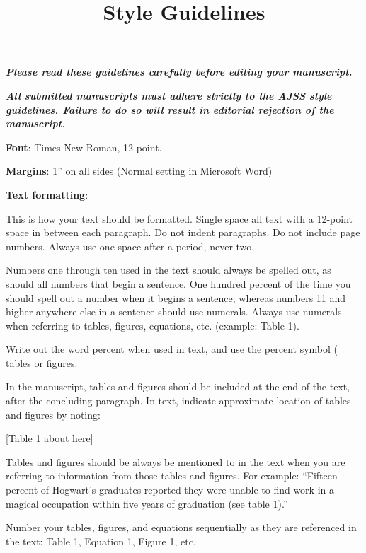 \documentclass{ajss}
\begin{document}
\title{\textbf{\fontsize{16pt}{16pt}\selectfont Style Guidelines}}
\date{}
\maketitle

\begin{center}
  \textbf{\textit{Please read these guidelines carefully before editing your manuscript.}}

  \textbf{\textit{All submitted manuscripts must adhere strictly to the AJSS style guidelines. Failure to do so
will result in editorial rejection of the manuscript.}}
\end{center}
\vspace{2\baselineskip}

\textbf{Font}: Times New Roman, 12-point.

\textbf{Margins}: 1'' on all sides (Normal setting in Microsoft Word)

\textbf{Text formatting}:

This is how your text should be formatted. Single space all text with a 12-point space in between
each paragraph. Do not indent paragraphs. Do not include page numbers. Always use one space
after a period, never two.

Numbers one through ten used in the text should always be spelled out, as should all numbers
that begin a sentence. One hundred percent of the time you should spell out a number when it
begins a sentence, whereas numbers 11 and higher anywhere else in a sentence should use
numerals. Always use numerals when referring to tables, figures, equations, etc. (example: Table
1).

Write out the word percent when used in text, and use the percent symbol (%
tables or figures.

In the manuscript, tables and figures should be included at the end of the text, after the
concluding paragraph. In text, indicate approximate location of tables and figures by noting:

[Table 1 about here]

Tables and figures should be always be mentioned to in the text when you are referring to
information from those tables and figures. For example: “Fifteen percent of Hogwart’s graduates
reported they were unable to find work in a magical occupation within five years of graduation
(see table 1).”

Number your tables, figures, and equations sequentially as they are referenced in the text: Table
1, Equation 1, Figure 1, etc.
\end{document}
